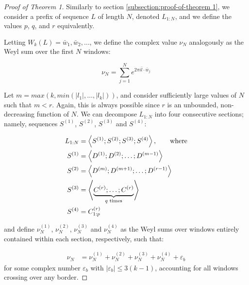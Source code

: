 \documentclass[11pt,a4paper]{tesis}
\theoremstyle{plain}
\theoremstyle{definition}
\begin{document}
\begin{proof}[Proof of Theorem 1]
  Similarly to section \ref{subsection:proof-of-theorem 1}, we consider a prefix of sequence $L$ of length $N$, denoted $L_{1:N}$, and we define the values $p$, $q$, and $r$ equivalently.

  Letting $W_k(L) = \bar{w}_1, \bar{w}_2, \dots$, we define the complex value $\nu_N$ analogously as the Weyl sum over the first $N$ windows:

  \begin{equation*}
    \nu_N = \sum_{j = 1}^{N} e^{2 \pi i \bar{l} \cdot \bar{w}_j}
  \end{equation*}

  Let $m = max\left(k, min\left(|l_1|, \dots, |l_k|\right)\right)$, and consider sufficiently large values of $N$ such that $m < r$. Again, this is always possible since $r$ is an unbounded, non-decreasing function of $N$. We can decompose $L_{1:N}$ into four consecutive sections; namely, sequences $S^{(1)}$, $S^{(2)}$, $S^{(3)}$ and $S^{(4)}$:

  \begin{equation*}
    \begin{aligned}
      L_{1:N} & = \left< S^{(1)} ; S^{(2)} ; S^{(3)} ; S^{(4)} \right> \text{, \hspace*{5mm} where} \\
      S^{(1)} & = \left< D^{(1)} ; D^{(2)} ; \dots ; D^{(m - 1)} \right> \\
      S^{(2)} & = \left< D^{(m)} ; D^{(m + 1)} ; \dots ; D^{(r - 1)} \right> \\
      S^{(3)} & = \left< \underbrace{C^{(r)} ; \dots ; C^{(r)}}_{q \text{ times}} \right> \\ 
      S^{(4)} & = C^{(r)}_{1:p}
    \end{aligned}
  \end{equation*}

  and define $\nu_N^{(1)}$, $\nu_N^{(2)}$, $\nu_N^{(3)}$ and $\nu_N^{(4)}$ as the Weyl sums over windows entirely contained within each section, respectively, such that:

  \begin{equation*}
    \begin{aligned}
      \nu_N & = \nu^{(1)}_N + \nu^{(2)}_N + \nu^{(3)}_N + \nu^{(4)}_N + \varepsilon_b
    \end{aligned}
  \end{equation*}
  for some complex number $\varepsilon_b$ with $|\varepsilon_b| \le 3 (k - 1)$, accounting for all windows crossing over any border.


\end{proof}
\end{document}
